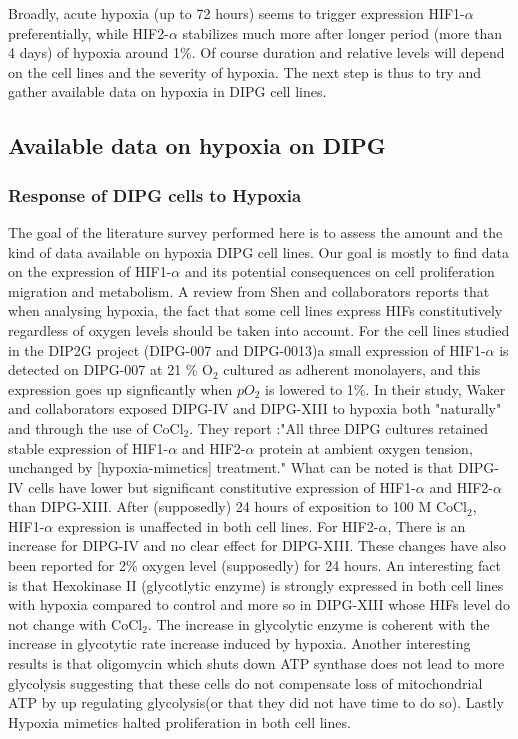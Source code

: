 \documentclass[11pt,a4paper]{article}
\begin{document}
Broadly, acute hypoxia (up to 72 hours) seems to trigger expression HIF1-$\alpha$ preferentially, while HIF2-$\alpha$ stabilizes much more after longer period (more than 4 days) of hypoxia around 1\%. Of course duration and relative levels will depend on the cell lines and the severity of hypoxia. The next step is thus to try and gather available data on hypoxia in DIPG cell lines.
  
\subsection{Available data on hypoxia on DIPG}
\subsubsection{Response of DIPG cells to Hypoxia}
The goal of the literature survey performed here is to assess the amount and the kind of data available on hypoxia DIPG cell lines. Our goal is mostly to find data on the expression of HIF1-$\alpha$ and its potential consequences on cell proliferation migration and metabolism. A review from Shen and collaborators reports that when analysing hypoxia, the fact that some cell lines express HIFs constitutively regardless of oxygen levels should be taken into account.\cite{Shen2020} For the cell lines studied in the DIP2G project (DIPG-007 and DIPG-0013)a small expression of HIF1-$\alpha$ is detected on DIPG-007 at 21 \% O$_2$ cultured as adherent monolayers, and this expression goes up signficantly when $pO_2$ is lowered to 1\%\cite{Bailleul2021}. In their study, Waker and collaborators exposed DIPG-IV and DIPG-XIII to hypoxia both "naturally" and through the use of CoCl$_2$.\cite{Waker2018} They report :"All three DIPG cultures retained stable expression of HIF1-$\alpha$ and HIF2-$\alpha$ protein at ambient oxygen tension, unchanged by [hypoxia-mimetics] treatment." What can be noted is that DIPG-IV cells have lower but significant constitutive expression of HIF1-$\alpha$ and HIF2-$\alpha$ than DIPG-XIII. After (supposedly) 24 hours of exposition to 100 \textmu M CoCl$_2$, HIF1-$\alpha$ expression is unaffected in both cell lines. For HIF2-$\alpha$, There is an increase for DIPG-IV and no clear effect for DIPG-XIII. These changes have also been reported for 2\% oxygen level (supposedly) for 24 hours. An interesting fact is that Hexokinase II (glycotlytic enzyme) is strongly expressed in both cell lines with hypoxia compared to control and more so  in DIPG-XIII whose HIFs level do not change with CoCl$_2$. The increase in glycolytic enzyme is coherent with the increase in glycotytic rate increase induced by hypoxia. Another interesting results is that oligomycin which shuts down ATP synthase does not lead to more glycolysis suggesting that these cells do not compensate loss of mitochondrial ATP by up regulating glycolysis(or that they did not have time to do so). Lastly Hypoxia mimetics halted proliferation in both cell lines.
\end{document}
